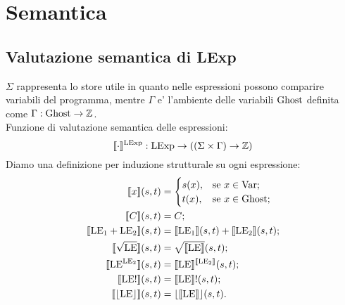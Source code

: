 \documentclass[a4paper, 12pt, oneside,fleqn]{book}
\begin{document}
\chapter{Semantica}
\section{Valutazione semantica di LExp}
$\Sigma$ rappresenta lo store utile in quanto nelle espressioni possono comparire variabili del programma, mentre $\Gamma$ e' l'ambiente delle variabili $\mathrm{Ghost}$ definita come $\Gamma\mathrel{:}\mathrm{Ghost}\rightarrow\mathbb{Z}$.\\
Funzione di valutazione semantica delle espressioni:
$$\llbracket\cdot\rrbracket ^{\mathrm{LExp}}: \mathrm{LExp} \rightarrow ((\Sigma \times \Gamma) \rightarrow \mathbb{Z})$$
Diamo una definizione per induzione strutturale su ogni espressione:
\begin{align*}
   \llbracket x \rrbracket(s,t) 
      &=
        \begin{cases}
                 s(x), &\text{se $x \in\mathrm{Var}$};\\t(x), &\text{se $ x \in\mathrm{Ghost}$};
        \end{cases}\\
   \llbracket  C\rrbracket(s,t) 
     &=  C;\\
   \llbracket \mathrm{LE}{_1}+\mathrm{LE}{_2} \rrbracket(s,t) 
     &= \llbracket \mathrm{LE}{_1} \rrbracket(s,t) + \llbracket \mathrm{LE}{_2}\rrbracket( s, t);\\
   \llbracket \sqrt{\mathrm{LE}} \rrbracket(s,t) 
     &= \sqrt{\llbracket\mathrm{LE}\rrbracket}(s,t);\\
   \llbracket \mathrm{LE}^{\mathrm{LE}{_2}}\rrbracket(s,t) 
     &= \llbracket\mathrm{LE}\rrbracket^{\llbracket\mathrm{LE}{_2}\rrbracket}(s,t);\\
   \llbracket \mathrm{LE}!\rrbracket(s,t) 
     &= \llbracket\mathrm{LE}\rrbracket!(s,t);\\
   \llbracket \lfloor \mathrm{LE} \rfloor\rrbracket(s,t) 
     &= \lfloor\llbracket \mathrm{LE} \rrbracket\rfloor(s,t).
\end{align*}
\end{document}
